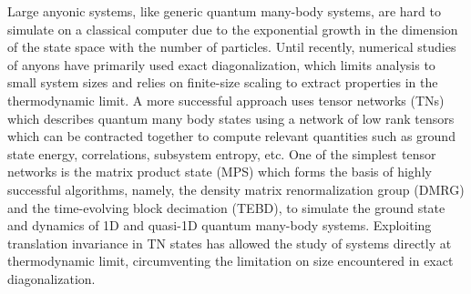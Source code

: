 \documentclass[aps,reprint,superscriptaddress,amsmath,amssymb,amsfonts,prb]{revtex4-1}
\begin{document}
Large anyonic systems, like generic quantum many-body systems, are hard to simulate on a classical computer due to the exponential growth in the dimension of the state space with the number of particles. Until recently, numerical studies of anyons have primarily used exact diagonalization,\cite{Feiguin2007,Trebst2008, Trebst2008a, Poilblanc2011a,Poilblanc2011,pfeifer2012} which limits analysis to small system sizes and relies on finite-size scaling to extract properties in the thermodynamic limit. A more successful approach uses tensor networks (TNs) which describes quantum many body states using a network of low rank tensors which can be contracted together to compute relevant quantities such as ground state energy, correlations, subsystem entropy, etc. One of the simplest tensor networks is the matrix product state (MPS) which forms the basis of highly successful algorithms, namely, the density matrix renormalization group (DMRG)\cite{white1992,white1993,schollwock2011} and the time-evolving block 
decimation (TEBD),\cite{Vidal2003,white2004,daley2004} to 
simulate the ground state and dynamics of 1D and quasi-1D
quantum many-body systems. Exploiting translation invariance in TN states has allowed the study of systems directly at thermodynamic limit, circumventing the limitation on size encountered in exact diagonalization.\cite{Vidal2006}


\end{document}
